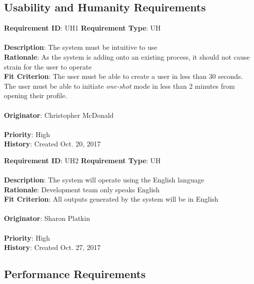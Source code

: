 \documentclass[11pt]{article}
\begin{document}
\subsection{Usability and Humanity Requirements}
\begin{framed}
	\noindent\textbf{Requirement ID}: UH1 \hfill \textbf{Requirement Type}: UH \hfill\\\\
	\noindent\textbf{Description}: The system must be intuitive to use \\
	\textbf{Rationale}: As the system is adding onto an existing process, it should not cause strain for the user to operate \\
	\textbf{Fit Criterion}: The user must be able to create a user in less than 30 seconds. The user must be able to initiate \textit{one-shot} mode in less than 2 minutes from opening their profile.  \\\\
	\textbf{Originator}: Christopher McDonald \\\\
	\textbf{Priority}: High \hfill \\
	\noindent\textbf{History}: Created Oct. 20, 2017
\end{framed}

\begin{framed}
	\noindent\textbf{Requirement ID}: UH2 \hfill \textbf{Requirement Type}: UH \hfill\\\\
	\noindent\textbf{Description}: The system will operate using the English language \\
	\textbf{Rationale}: Development team only speaks English \\
	\textbf{Fit Criterion}: All outputs generated by the system will be in English  \\\\
	\textbf{Originator}: Sharon Platkin \\\\
	\textbf{Priority}: High \hfill \\
	\noindent\textbf{History}: Created Oct. 27, 2017
\end{framed}

\subsection{Performance Requirements}
\end{document}
